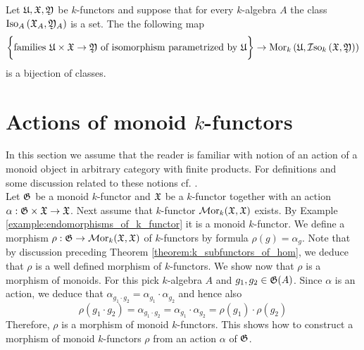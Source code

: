 \begin{corollary}\label{corollary:hom_isomorphism_bijection}
Let ${\mathfrak U},{\mathfrak X},{\mathfrak Y}$ be $k$-functors and suppose that for every $k$-algebra $A$ the class $\mathrm{Iso}_A\left({\mathfrak X}_A,{\mathfrak Y}_A\right)$ is a set. The the following map
$$\bigg\{\mbox{families }{\mathfrak U}\times {\mathfrak X}\rightarrow {\mathfrak Y}\mbox{ of isomorphism parametrized by }{\mathfrak U}\bigg\}\rightarrow \mathrm{Mor}_k\left({\mathfrak U},\mathcal{I}\mathrm{so}_k\left({\mathfrak X},{\mathfrak Y}\right)\right)$$
is a bijection of classes.
\end{corollary}


\section{Actions of monoid $k$-functors}\label{section:actions_of_monoid_k_functors}
\noindent
In this section we assume that the reader is familiar with notion of an action of a monoid object in arbitrary category with finite products. For definitions and some discussion related to these notions cf. {\cite[pages 5]{Maclane}}.\\
Let ${\mathfrak G}$ be a monoid $k$-functor and ${\mathfrak X}$ be a $k$-functor together with an action $\alpha:{\mathfrak G}\times {\mathfrak X} \rightarrow {\mathfrak X}$. Next assume that $k$-functor $\mathcal{M}\mathrm{or}_k({\mathfrak X},{\mathfrak X})$ exists. By Example \ref{example:endomorphisms_of_k_functor} it is a monoid $k$-functor. We define a morphism $\rho:{\mathfrak G}\rightarrow \mathcal{M}\mathrm{or}_k({\mathfrak X},{\mathfrak X})$ of $k$-functors by formula $\rho(g) = \alpha_{g}$. Note that by discussion preceding Theorem \ref{theorem:k_subfunctors_of_hom}, we deduce that $\rho$ is a well defined morphism of $k$-functors. We show now that $\rho$ is a morphism of monoids. For this pick $k$-algebra $A$ and $g_1, g_2\in {\mathfrak G}(A)$. Since $\alpha$ is an action, we deduce that $\alpha_{g_1 \cdot g_2} = \alpha_{g_1} \cdot \alpha_{g_2}$ and hence also
$$\rho(g_1\cdot g_2) = \alpha_{g_1 \cdot g_2} = \alpha_{g_1}\cdot \alpha_{g_2} = \rho(g_1)\cdot \rho(g_2)$$
Therefore, $\rho$ is a morphism of monoid $k$-functors. This shows how to construct a morphism of monoid $k$-functors $\rho$ from an action $\alpha$ of ${\mathfrak G}$.

